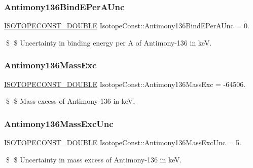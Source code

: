 \subsubsection{\texorpdfstring{Antimony136\+Bind\+E\+Per\+A\+Unc}{Antimony136BindEPerAUnc}}
{\footnotesize\ttfamily \mbox{\hyperlink{group___isotope_const-_macros_ga8f45a7272ce02c0b4c65c44636ed719a}{I\+S\+O\+T\+O\+P\+E\+C\+O\+N\+S\+T\+\_\+\+D\+O\+U\+B\+LE}} Isotope\+Const\+::\+Antimony136\+Bind\+E\+Per\+A\+Unc = 0.}

\$ \$ Uncertainty in binding energy per A of Antimony-\/136 in keV. \mbox{\label{group___isotope_const-_antimony-_sb136_ga1ba719296ede0214ce89d87f7683073e}} 
\subsubsection{\texorpdfstring{Antimony136\+Mass\+Exc}{Antimony136MassExc}}
{\footnotesize\ttfamily \mbox{\hyperlink{group___isotope_const-_macros_ga8f45a7272ce02c0b4c65c44636ed719a}{I\+S\+O\+T\+O\+P\+E\+C\+O\+N\+S\+T\+\_\+\+D\+O\+U\+B\+LE}} Isotope\+Const\+::\+Antimony136\+Mass\+Exc = -\/64506.}

\$ \$ Mass excess of Antimony-\/136 in keV. \mbox{\label{group___isotope_const-_antimony-_sb136_ga9295acb3ba4e053ecd23d19d98db847e}} 
\subsubsection{\texorpdfstring{Antimony136\+Mass\+Exc\+Unc}{Antimony136MassExcUnc}}
{\footnotesize\ttfamily \mbox{\hyperlink{group___isotope_const-_macros_ga8f45a7272ce02c0b4c65c44636ed719a}{I\+S\+O\+T\+O\+P\+E\+C\+O\+N\+S\+T\+\_\+\+D\+O\+U\+B\+LE}} Isotope\+Const\+::\+Antimony136\+Mass\+Exc\+Unc = 5.}

\$ \$ Uncertainty in mass excess of Antimony-\/136 in keV. \mbox{\label{group___isotope_const-_antimony-_sb136_ga06b6cb5d721d81b6c0747cdd27aa5713}} 
